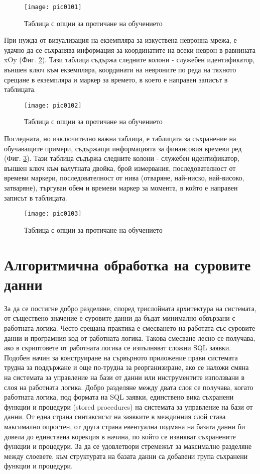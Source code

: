 \begin{figure}[h]
  \centering
  \texttt{[image: pic0101]}
  \caption{Таблица с опции за протичане на обучението}
\label{fig:pic0101}
\end{figure}
\FloatBarrier

При нужда от визуализация на екземпляра за изкуствена невронна мрежа, е удачно да се съхранява информация за координатите на всеки неврон в равнината xOy (Фиг. \ref{fig:pic0102}). Тази таблица съдържа следните колони - служебен идентификатор, външен ключ към екземпляра, координати на невроните по реда на тяхното срещане в екземпляра и маркер за времето, в което е направен записът в таблицата. 

\begin{figure}[h]
  \centering
  \texttt{[image: pic0102]}
  \caption{Таблица с опции за протичане на обучението}
\label{fig:pic0102}
\end{figure}
\FloatBarrier

Последната, но изключително важна таблица, е таблицата за съхранение на обучаващите примери, съдържащи информацията за финансовия времеви ред (Фиг. \ref{fig:pic0103}). Тази таблица съдържа следните колони - служебен идентификатор, външен ключ към валутната двойка, брой измервания, последователност от времеви маркери, последователност от нива (отваряне, най-ниско, най-високо, затваряне), търгуван обем и времеви маркер за момента, в който е направен записът в таблицата. 

\begin{figure}[h]
  \centering
  \texttt{[image: pic0103]}
  \caption{Таблица с опции за протичане на обучението}
\label{fig:pic0103}
\end{figure}
\FloatBarrier

\section{Алгоритмична обработка на суровите данни}

За да се постигне добро разделяне, според трислойната архитектура на системата, от съществено значение е суровите данни да бъдат минимално обвързани с работната логика. Често срещана практика е смесването на работата със суровите данни и програмния код от работната логика. Такова смесване лесно се получава, ако в скриптовете от работната логика се изпълняват сложни SQL заявки. Подобен начин за конструиране на сървърното приложение прави системата трудна за поддържане и още по-трудна за реорганизиране, ако се наложи смяна на системата за управление на бази от данни или инструментите използвани в слоя на работната логика. Добро разделяне между двата слоя се получава, когато работната логика, под формата на SQL заявки, единствено вика съхранени функции и процедури (stored procedures) на системата за управление на бази от данни. От една страна синтаксисът на заявките в междинния слой става максимално опростен, от друга страна евентуална подмяна на базата данни би довела до единствена корекция в начина, по който се извикват съхранените функции и процедури. За да се удовлетвори стремежът за максимално разделяне между слоевете, към структурата на базата данни са добавени група съхранени функции и процедури. 

